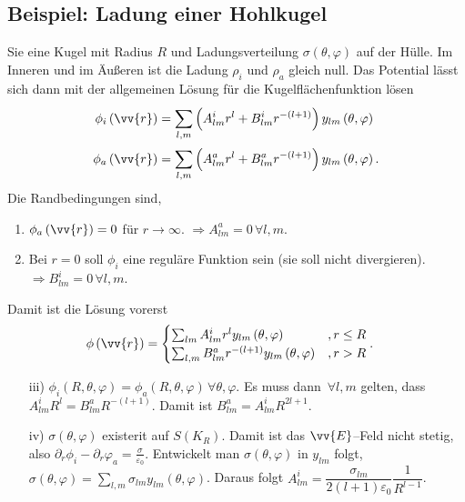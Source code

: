 \documentclass[a4paper,12pt]{article}
\numberwithin{equation}{section}
\begin{document}
\subsection{Beispiel: Ladung einer Hohlkugel}
Sie eine Kugel mit Radius $R$ und Ladungsverteilung $\sigma \left(\theta ,\varphi \right)$ auf der Hülle. Im Inneren und im Äußeren ist die Ladung $\rho _i$ und $\rho _a$ gleich null. Das Potential lässt sich dann mit der allgemeinen Lösung für die Kugelflächenfunktion lösen
\begin{align} 
        \phi _i\left(\vv{r}\right)&=\sum_{l,m}^{}\left(A^i_{l m}r^l+B^i_{l m}r^{-\left(l+1\right)}\right)y_{l m}\left(\theta ,\varphi \right)\\
        \phi _a\left(\vv{r}\right)&=\sum_{l,m}^{}\left(A^a_{l m}r^l+B^a_{l m}r^{-\left(l+1\right)}\right)y_{l m}\left(\theta ,\varphi \right)
.\end{align} 
Die Randbedingungen sind,
\begin{enumerate}[label=\roman*)]
        \item $\phi _a\left(\vv{r}\right)=0$ für $r\rightarrow \infty$. $\Rightarrow A_{l m}^a=0\,\forall l,m$.
        \item Bei $r=0$ soll $\phi _i$ eine reguläre Funktion sein (sie soll nicht divergieren).$\Rightarrow B_{l m}^i=0\,\forall l,m$.
\end{enumerate}
Damit ist die Lösung vorerst
\begin{align} 
        \phi \left(\vv{r}\right)&=\begin{cases}
                \sum_{l m}^{}A_{l m}^ir^ly_{l m}\left(\theta ,\varphi \right)&,r\leq R\\
                \sum_{l,m}^{}B_{l m}^ar^{-\left(l+1\right)}y_{l m}\left(\theta ,\varphi \right)&,r>R
        \end{cases}
.\end{align} 
\begin{enumerate}[label=\roman*)]
        \item[iii)] $\phi _i\left(R,\theta ,\varphi \right)=\phi _a\left(R,\theta ,\varphi \right)\,\forall \theta ,\varphi $. Es muss dann $\,\forall l,m$ gelten, dass $A^i_{l m}R^l=B_{l m}^aR^{-\left(l+1\right)}$. Damit ist $B_{l m}^a=A^i_{l m}R^{2l+1}$.
        \item[iv)] $\sigma \left(\theta ,\varphi \right)$ existerit auf $S\left(K_R\right)$. Damit ist das $\vv{E}$--Feld nicht stetig, also $\partial_r \phi _i-\partial_r \varphi _a=\tfrac{\sigma }{\varepsilon _0}$. Entwickelt man $\sigma \left(\theta ,\varphi \right)$ in $y_{l m}$ folgt, $\sigma \left(\theta ,\varphi \right)=\sum_{l,m}^{}\sigma _{l m}y_{l m}\left(\theta ,\varphi \right)$. Daraus folgt $A_{l m}^i=\dfrac{\sigma _{l m}}{2\left(l+1\right)\varepsilon _0}\dfrac{1}{R^{l-1}}$.
\end{enumerate}
\end{document}
